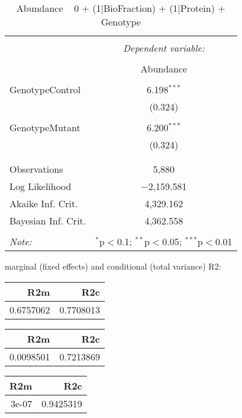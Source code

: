 \documentclass[11pt]{report}
\begin{document}
\begin{table}[!htbp] \centering 
  \caption{Abundance ~ 0 + (1|BioFraction) + (1|Protein) + Genotype} 
  \label{} 
\begin{tabular}{@{\extracolsep{5pt}}lc} 
\\[-1.8ex]\hline 
\hline \\[-1.8ex] 
 & \multicolumn{1}{c}{\textit{Dependent variable:}} \\ 
\cline{2-2} 
\\[-1.8ex] & Abundance \\ 
\hline \\[-1.8ex] 
 GenotypeControl & 6.198$^{***}$ \\ 
  & (0.324) \\ 
  & \\ 
 GenotypeMutant & 6.200$^{***}$ \\ 
  & (0.324) \\ 
  & \\ 
\hline \\[-1.8ex] 
Observations & 5,880 \\ 
Log Likelihood & $-$2,159.581 \\ 
Akaike Inf. Crit. & 4,329.162 \\ 
Bayesian Inf. Crit. & 4,362.558 \\ 
\hline 
\hline \\[-1.8ex] 
\textit{Note:}  & \multicolumn{1}{r}{$^{*}$p$<$0.1; $^{**}$p$<$0.05; $^{***}$p$<$0.01} \\ 
\end{tabular} 
\end{table} 
marginal (fixed effects) and conditional (total variance) R2:

\begin{tabular}{r|r}
\hline
R2m & R2c\\
\hline
0.6757062 & 0.7708013\\
\hline
\end{tabular}

\begin{tabular}{r|r}
\hline
R2m & R2c\\
\hline
0.0098501 & 0.7213869\\
\hline
\end{tabular}

\begin{tabular}{r|r}
\hline
R2m & R2c\\
\hline
3e-07 & 0.9425319\\
\hline
\end{tabular}
\end{document}
